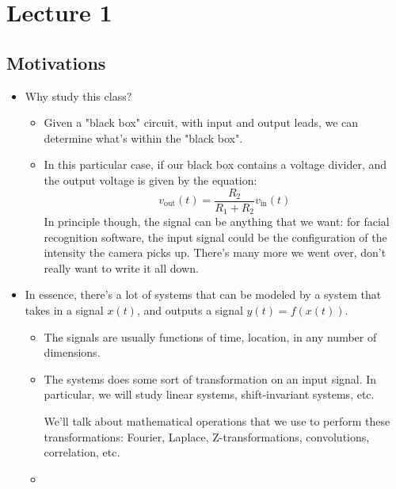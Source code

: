 \section{Lecture 1}
\subsection{Motivations} 
\begin{itemize}
	\item Why study this class?
		\begin{itemize}
			\item Given a "black box" circuit, with input and output leads, we can determine what's within 
				the "black 
				box".
			\item In this particular case, if our black box contains a voltage divider, and the output voltage is given 
				by the equation:
				\[
				v_{\text{out}}(t) = \frac{R_2}{R_1+ R_2}v_{\text{in}}(t)
				\] 
				In principle though, the signal can be anything that we want: for facial recognition software, the input
				signal could be the configuration of the intensity the camera picks up. There's many more we went over, 
				don't really want to write it all down. 
		\end{itemize}
	\item In essence, there's a lot of systems that can be modeled by a system that takes in a signal \( x(t) \), and 
		outputs a signal \( y(t) = f(x(t))\).
		\begin{itemize}
			\item The signals are usually functions of time, location, in any number of dimensions.
			\item The systems does some sort of transformation on an input signal. In particular, we will study 
				linear systems, shift-invariant systems, etc.
				
				We'll talk about mathematical operations that we use to perform these transformations: Fourier, 
				Laplace, Z-transformations, convolutions, correlation, etc.\item 
	\end{itemize}
\end{itemize}
